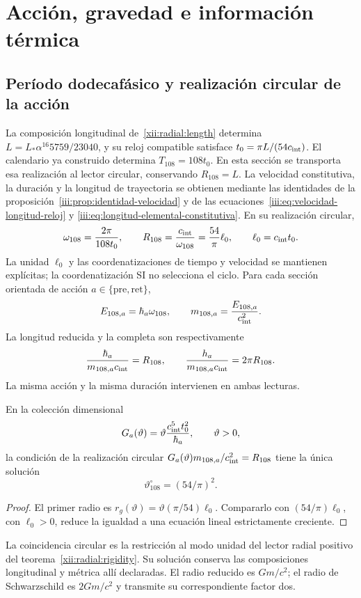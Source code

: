 \section{Acción, gravedad e información térmica}
\label{v:ant:sec:gravity}
\subsection{Período dodecafásico y realización circular de la acción}
La composición longitudinal de~\eqref{xii:radial:length} determina
\(L=L_*\alpha^{16}5759/23040\), y su reloj compatible satisface
\(t_0=\pi L/(54c_{\rm int})\). El calendario ya construido determina
$T_{108}=108t_0$. En esta sección se transporta esa realización al
lector circular, conservando \(R_{108}=L\).
La velocidad constitutiva, la duración y la longitud de trayectoria se
obtienen mediante las identidades de la
proposición~\ref{iii:prop:identidad-velocidad} y de las
ecuaciones~\eqref{iii:eq:velocidad-longitud-reloj} y
\eqref{iii:eq:longitud-elemental-constitutiva}.
En su realización circular,
\[
\omega_{108}=\frac{2\pi}{108t_0},\qquad
R_{108}=\frac{c_{\rm int}}{\omega_{108}}
=\frac{54}{\pi}\ell_0,\qquad \ell_0=c_{\rm int}t_0.
\]
La unidad $\ell_0$ y las coordenatizaciones de tiempo y velocidad se mantienen
explícitas; la coordenatización SI no selecciona el ciclo.
Para cada sección orientada de acción $a\in\{\mathrm{pre},\mathrm{ret}\}$,
\[
E_{108,a}=\hbar_a\omega_{108},\qquad
m_{108,a}=\frac{E_{108,a}}{c_{\rm int}^2}.
\]
La longitud reducida y la completa son respectivamente
\[
\frac{\hbar_a}{m_{108,a}c_{\rm int}}=R_{108},
\qquad
\frac{h_a}{m_{108,a}c_{\rm int}}=2\pi R_{108}.
\]
La misma acción y la misma duración intervienen en ambas lecturas.

\begin{proposition}
En la colección dimensional
\[
G_a(\vartheta)=\vartheta\frac{c_{\rm int}^5t_0^2}{\hbar_a},
\qquad \vartheta>0,
\]
la condición de la realización circular
$G_a(\vartheta)m_{108,a}/c_{\rm int}^2=R_{108}$
tiene la única solución
\[
\vartheta^\circ_{108}=(54/\pi)^2.
\]
\end{proposition}
\begin{proof}
El primer radio es
$r_g(\vartheta)=\vartheta(\pi/54)\ell_0$.
Compararlo con $(54/\pi)\ell_0$, con $\ell_0>0$, reduce la
igualdad a una ecuación lineal estrictamente creciente.
\end{proof}
La coincidencia circular es la restricción al modo unidad del lector
radial positivo del teorema~\ref{xii:radial:rigidity}. Su solución
conserva las composiciones longitudinal y métrica allí declaradas.
El radio reducido es \(Gm/c^2\); el radio de Schwarzschild es
\(2Gm/c^2\) y transmite su correspondiente factor dos.

